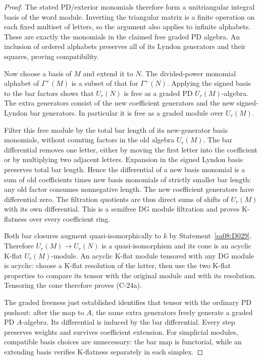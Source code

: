 \begin{proof}
The stated PD/exterior monomials therefore form a unitriangular
integral basis of the word module. Inverting the triangular
matrix is a finite operation on each fixed multiset of letters,
so the argument also applies to infinite alphabets. These are
exactly the monomials in the claimed free graded PD algebra.
An inclusion of ordered alphabets preserves all of its Lyndon
generators and their squares, proving compatibility.

Now choose a basis of $M$ and extend it to $N$. The divided-power
monomial alphabet of $\Gamma^+(M)$ is a subset of that for
$\Gamma^+(N)$. Applying the signed basis to the bar factors shows
that $U_r(N)$ is free as a graded PD $U_r(M)$-algebra. The extra
generators consist of the new coefficient generators and the new
signed-Lyndon bar generators. In particular it is free as a
graded module over $U_r(M)$.

Filter this free module by the total bar length of its new-generator
basis monomials, without counting factors in the old algebra
$U_r(M)$. The bar differential removes one letter, either by
moving the first letter into the coefficient or by multiplying
two adjacent letters. Expansion in the signed Lyndon basis
preserves total bar length. Hence the differential of a new
basis monomial is a sum of old coefficients times new basis
monomials of strictly smaller bar length: any old factor consumes
nonnegative length. The new coefficient generators have
differential zero. The filtration quotients are thus direct sums
of shifts of $U_r(M)$ with its own differential. This is a
semifree DG module filtration and proves K-flatness over every
coefficient ring.

Both bar closures augment quasi-isomorphically to $k$ by
Statement~\ref{sa08:D029}. Therefore $U_r(M)\to U_r(N)$ is a
quasi-isomorphism and its cone is an acyclic K-flat
$U_r(M)$-module. An acyclic K-flat module tensored with any
DG module is acyclic: choose a K-flat resolution of the latter,
then use the two K-flat properties to compare its tensor with
the original module and with its resolution. Tensoring the cone
therefore proves (C-24a).

The graded freeness just established identifies that tensor with
the ordinary PD pushout: after the map to $A$, the same extra
generators freely generate a graded PD $A$-algebra. Its
differential is induced by the bar differential. Every step
preserves weights and survives coefficient extension. For
simplicial modules, compatible basis choices are unnecessary:
the bar map is functorial, while an extending basis verifies
K-flatness separately in each simplex.
\end{proof}


